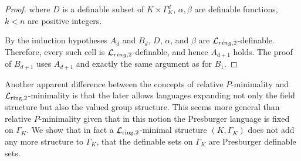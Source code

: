 \begin{proof}
where $D$ is a definable subset of $K\times\Gamma_K^d$, $\alpha,\beta$ are definable functions, $k<n$ are positive integers.%
%
%
%
%
%
%
%
%
%

By the induction hypotheses $A_d$ and $B_d$, $D$, $\alpha$, and $\beta$ are $\mathcal{L}_{ring,2}$-definable. Therefore, every such cell is $\mathcal{L}_{ring,2}$-definable, and hence $A_{d+1}$ holds. The proof of $B_{d+1}$ uses $A_{d+1}$ and exactly the same argument as for $B_1$. 
\end{proof}

Another apparent difference between the concepts of relative $P$-minimality and $\mathcal{L}_{\text{ring,2}}$-minimality is that the later allows languages expanding not only the field structure but also the valued group structure. This seems more general than relative $P$-minimality given that in this notion the Presburger language is fixed on $\Gamma_K$. We show that in fact a $\mathcal{L}_{\text{ring,2}}$-minimal structure $(K,\Gamma_K)$ does not add any more structure to $\Gamma_K$, that the definable sets on $\Gamma_K$ are Presburger definable sets. 

